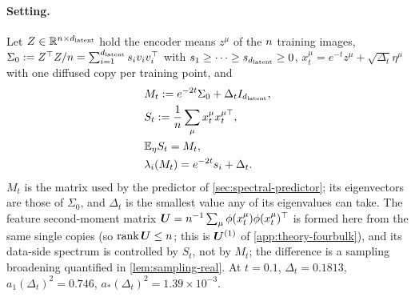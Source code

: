 \paragraph{Setting.}
Let $Z\in\mathbb{R}^{n\times d_{\mathrm{latent}}}$ hold the encoder means $z^\mu$ of the $n$ training images, $\Sigma_0:=Z^\top Z/n=\sum_{i=1}^{d_{\mathrm{latent}}}s_iv_iv_i^\top$ with $s_1\ge\dots\ge s_{d_{\mathrm{latent}}}\ge0$, $x_t^\mu=e^{-t}z^\mu+\sqrt{\Delta_t}\eta^\mu$ with one diffused copy per training point, and
\begin{equation}\label{eq:Mt-real}
\begin{aligned}
&M_t:=e^{-2t}\Sigma_0+\Delta_tI_{d_{\mathrm{latent}}},\\ & S_t:=\frac1{n}\sum_\mu x_t^\mu x_t^{\mu\top},\\ & \mathbb{E}_\eta S_t=M_t,\\ & \lambda_i(M_t)=e^{-2t}s_i+\Delta_t .
\end{aligned}
\end{equation}
$M_t$ is the matrix used by the predictor of \cref{sec:spectral-predictor}; its eigenvectors are those of $\Sigma_0$, and $\Delta_t$ is the smallest value any of its eigenvalues can take. The feature second-moment matrix $\bm{U}=n^{-1}\sum_\mu\phi(x_t^\mu)\phi(x_t^\mu)^\top$ is formed here from the same single copies (so $\operatorname{rank}\bm{U}\le n$; this is $\bm{U}^{(1)}$ of \cref{app:theory-fourbulk}), and its data-side spectrum is controlled by $S_t$, not by $M_t$; the difference is a sampling broadening quantified in \cref{lem:sampling-real}. At $t=0.1$, $\Delta_t=0.1813$, $a_1(\Delta_t)^2=0.746$, $a_\ast(\Delta_t)^2=1.39\times10^{-3}$.

